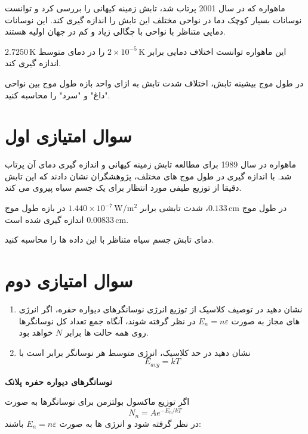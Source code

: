 \documentclass[a4paper,12pt]{article}
\begin{document}
	ماهواره  که در سال 2001 پرتاب شد، تابش زمینه کیهانی  را بررسی کرد و توانست نوسانات بسیار کوچک دما در نواحی مختلف این تابش را اندازه گیری کند. این نوسانات دمایی متناظر با نواحی با چگالی زیاد و کم در جهان اولیه هستند.
	
	این ماهواره توانست اختلاف دمایی برابر \(2 \times 10^{-5}\,\mathrm{K}\) را در دمای متوسط \(2.7250\,\mathrm{K}\) اندازه گیری کند.
	
	در طول موج بیشینه تابش، اختلاف شدت تابش به ازای واحد بازه طول موج بین نواحی "داغ" و "سرد" را محاسبه کنید.
	
	\section{سوال امتیازی اول}
	
	ماهواره  در سال 1989 برای مطالعه تابش زمینه کیهانی و اندازه گیری دمای آن پرتاب شد. با اندازه گیری در طول موج های مختلف، پژوهشگران نشان دادند که این تابش دقیقا از توزیع طیفی مورد انتظار برای یک جسم سیاه پیروی می کند.
	
	در طول موج \(0.133\,\mathrm{cm}\)، شدت تابشی برابر \(1.440 \times 10^{-7}\,\mathrm{W/m^2}\) در بازه طول موج \(0.00833\,\mathrm{cm}\) اندازه گیری شده است.
	
	دمای تابش جسم سیاه متناظر با این داده ها را محاسبه کنید.
	\section{سوال امتیازی دوم}
	
	
	\begin{enumerate}
		
		\item[(الف)] نشان دهید در توصیف کلاسیک از توزیع انرژی نوسانگرهای دیواره حفره، اگر انرژی های مجاز به صورت \(E_n = n\varepsilon\) در نظر گرفته شوند، آنگاه جمع تعداد کل نوسانگرها روی همه حالت ها برابر \(N\) خواهد بود.
		
		\item[(ب)] نشان دهید در حد کلاسیک، انرژی متوسط هر نوسانگر برابر است با
		\[
		E_{avg} = kT
		\]
		
	\end{enumerate}
	
	\textbf{نوسانگرهای دیواره حفره پلانک}
	
	اگر توزیع ماکسول بولتزمن برای نوسانگرها به صورت
	\[
	N_n = A e^{-E_n/kT}
	\]
	در نظر گرفته شود و انرژی ها به صورت \(E_n = n\varepsilon\) باشند:
	
\end{document}
